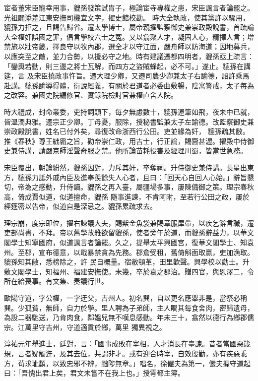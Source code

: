 \begin{pinyinscope}
 宦者董宋臣寵幸用事，貔孫發策試胄子，極論宦寺專權之患，宋臣諷言者論罷之。光祖闢添差江東安撫司機宜文字，擢史館校勘。
 時大全執政，使其黨許以驟用，貔孫力拒之，且謁告歸省。遷太學博士，屬帝親擢監察御史兼崇政殿說書，首疏論大全權奸誤國之罪，倡言學校六士之冤。又以翕聚人才，凝固人心，精擇人言；增禁旅以壯帝畿，擇良守以牧內郡，選全才以守江面，嚴舟師以防海道；因地募兵，以應突至之敵，並力合勢，以援必守之地。時有建議遷都四明者，貔孫亟上疏言：「鑾輿若動，則三邊之將士瓦解，而四方之盜賊蜂起，必不可。」遂止。貔孫在講筵，言
 及宋臣撓政事忤旨。遷大理少卿，又遷司農少卿兼太子右諭德，詔許乘馬赴講。貔孫諭導得體，衍說經義，有關於君道者必委曲敷暢，陰寓警戒，太子每為之改容。兼國史院編修官、實錄院檢討官兼權直舍人院。



 時大禮成，封命叢委，吏持詞頭下，每夕無慮數十，貔孫運筆如飛，夜未中已就，皆溫潤典雅。遷宗正少卿。丁母憂，服除，授秘書監兼太子左諭德。改監察御史兼崇政殿說書，姓名已付外矣，尋復改命浙西行公田。吏並緣為奸，
 貔孫疏其敝。推《春秋》尊王絀霸之旨，勸帝崇仁政，用吉士，行正論，賜齎甚渥。擢殿中侍御史兼侍講，請嚴京師淫聲奇服之禁。他所論苗耗役害及經理川蜀，皆當世急務。



 宋臣覆出，朝論紛然，貔孫因對，力斥其奸，卒奪祠。升侍御史兼侍講。長星出東方，貔孫力詆外戚內臣及進奉羨餘失人心者，且曰：「回天心自回人心始。」辭旨懇切，帝為之感動，升侍讀。貔孫之再入臺，屬疆場多事，屢陳備御之策。理宗春秋高，倚成賈似道，似道擅命，貔孫
 隨事進諫，不肯阿附，至若行公田之政，屢於經筵密以告帝，似道自是深忌之。貔孫累疏求去。



 理宗崩，度宗即位，擢右諫議大夫，賜紫金魚袋兼賜章服犀帶，以疾乞辭言職，遷吏部尚書，不拜。帝以舊學故雅欲留貔孫，使者旁午於道，而貔孫辭益力，以華文閣學士知寧國府，似道諷言者論罷。久之，提舉太平興國宮，復華文閣學士、知袁州。至郡，宣布德意，以戢暴禁貪為先務。郡倉受租，舊倚斛面取贏，吏加漁取。貔孫知其敝，悉榜除之，許
 民自概量。宿敝頓革，田里歡聲。興學校以勸士。升敷文閣學士，知福州、福建安撫使。未幾，卒於袁之郡治。贈四官，與恩澤二，令所在給喪事。有文集、奏議行世。



 歐陽守道，字公權，一字迂父，吉州人。初名巽，自以更名應舉非是，當祭必稱巽。少孤貧，無師，自力於學。里人聘為子弟師，主人瞷其每食舍肉，密歸遺母，為設二器馳送，乃肯肉食，鄰媼兒無不嘆息感動。年未三十，翕然以德行為鄉郡儒宗。江萬里守吉州，守道適貢於鄉，萬里
 獨異視之。



 淳祐元年舉進士，廷對，言：「國事成敗在宰相，人才消長在臺諫。昔者當國惡箴規，言者疑觸迕，及其去位，共謂非才。或有迎合時宰，自效殷勤，亦有疾惡乖方，茍求玼纇，以致忠邪不辨，黜陟無章。」唱名，徐儼夫為第一，儼夫握守道起曰：「吾愧出君上矣，君文未嘗不在我上也。」授雩都主簿。




\end{pinyinscope}
